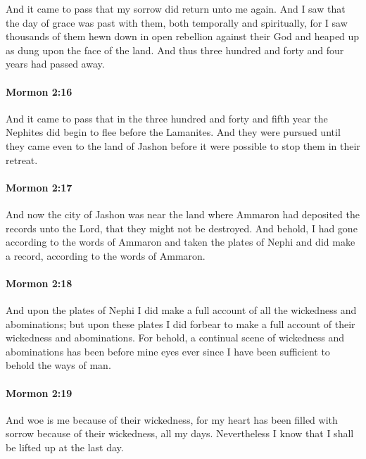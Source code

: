 			And it came to pass that my sorrow did return unto me again.
			And I saw that the day of grace was past with them,
			both temporally and spiritually,
			for I saw thousands of them hewn down
			in open rebellion against their God
			and heaped up as dung upon the face of the land.
			And thus three hundred and forty and four years had passed away.

		\paragraph{Mormon 2:16} %
			\label{MORMON-2-16}

			And it came to pass that in the three hundred and forty and fifth year
			the Nephites did begin to flee before the Lamanites.
			And they were pursued until they came even to the land of Jashon
			before it were possible to stop them in their retreat.

		\paragraph{Mormon 2:17} %
			\label{MORMON-2-17}

			And now the city of Jashon was near the land
			where Ammaron had deposited the records unto the Lord,
			that they might not be destroyed.
			And behold, I had gone according to the words of Ammaron
			and taken the plates of Nephi and did make a record,
			according to the words of Ammaron.

		\paragraph{Mormon 2:18} %
			\label{MORMON-2-18}

			And upon the plates of Nephi I did make a full account
			of all the wickedness and abominations;
			but upon these plates I did forbear to make a full account
			of their wickedness and abominations.
			For behold, a continual scene of wickedness and abominations
			has been before mine eyes
			ever since I have been sufficient to behold the ways of man.

		\paragraph{Mormon 2:19} %
			\label{MORMON-2-19}

			And woe is me because of their wickedness,
			for my heart has been filled with sorrow
			because of their wickedness, all my days.
			Nevertheless I know that I shall be lifted up at the last day.

